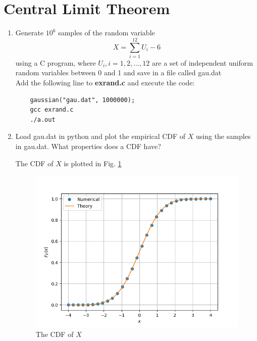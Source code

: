 \documentclass[journal,12pt,twocolumn]{IEEEtran}
\renewcommand\thesection{\arabic{section}}
\begin{document}
\section{Central Limit Theorem}
%
\begin{enumerate}[label=\thesection.\arabic*
,ref=\thesection.\theenumi]

%
\item
Generate $10^6$ samples of the random variable
%
\begin{equation}
X = \sum_{i=1}^{12}U_i -6
\end{equation}
%
using a C program, where $U_i, i = 1,2,\dots, 12$ are  a set of independent uniform random variables between 0 and 1
and save in a file called gau.dat
\\
\solution
Add the following line to \textbf{exrand.c} and execute the code:
\begin{lstlisting}
    gaussian("gau.dat", 1000000);
    gcc exrand.c
    ./a.out
\end{lstlisting}

%
\item
Load gau.dat in python and plot the empirical CDF of $X$ using the samples in gau.dat. What properties does a CDF have?
\\
\solution 




The CDF of $X$ is plotted in Fig. \ref{fig:gauss_cdf}
\begin{figure}
\centering
\includegraphics[width=\columnwidth]{./figures/CDF_gau.png}
\caption{The CDF of $X$}
\label{fig:gauss_cdf}
\end{figure}



\end{enumerate}
\end{document}
